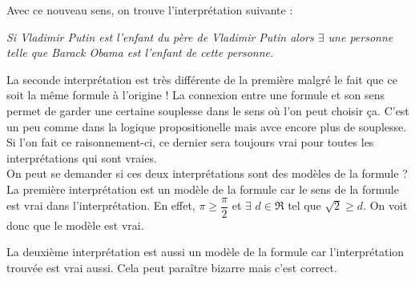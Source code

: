 Avec ce nouveau sens, on trouve l'interprétation suivante : 
\begin{center}
\textit{Si Vladimir Putin est l'enfant du père de Vladimir Putin alors $\exists$ une personne telle que Barack Obama est l'enfant de cette personne.}
\end{center}
La seconde interprétation est très différente de la première malgré le fait que ce soit la même formule à l'origine ! La connexion entre une formule et son sens permet de garder une certaine souplesse dans le sens où l'on peut choisir ça. C'est un peu comme dans la logique propositionelle mais avce encore plus de souplesse. Si l'on fait ce raisonnement-ci, ce dernier sera toujours vrai pour toutes les interprétations qui sont vraies. \\

On peut se demander si ces deux interprétations sont des modèles de la formule ? \\
La première interprétation est un modèle de la formule car le sens de la formule est vrai dans l'interprétation. En effet, $\pi \geq \dfrac{\pi}{2}$ et $\exists$ $ d \in \Re$ tel que $\sqrt2 \geq d$. On voit donc que le modèle est vrai.

La deuxième interprétation est aussi un modèle de la formule car l'interprétation trouvée est vrai aussi. Cela peut paraître bizarre mais c'est correct. 
